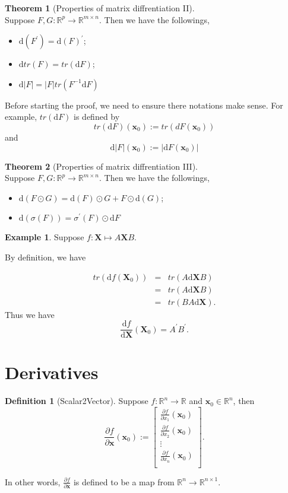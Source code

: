 \documentclass[12pt]{article}
\theoremstyle{definition}
\newtheorem{definition}{Definition}[section]
\newtheorem{example}{Example}[section]
\newtheorem{theorem}{Theorem}[section]
\newcommand{\x}{\mathbf{x}}
\newcommand{\R}{\mathbb{R}}
\newcommand{\X}{\mathbf{X}}
\newcommand{\D}{\mathrm{d}}
\begin{document}
\begin{theorem}[Properties of matrix diffrentiation II] \ \\
Suppose $F,G: \R^p \to \R^{ m\times n}$.
Then we have the followings,
\begin{itemize}
	\item $\D (F^\prime) = \D(F)^\prime$;
	\item $\D tr(F) = tr(\D F)$;
	\item $\D |F| = |F|tr(F^{-1}\D F)$
\end{itemize}
Before starting the proof, we need to ensure there notations make sense. For example,  $tr(\D F)$ is defined by 
$$
tr(\D F)(\x_0):=tr(dF(\x_0))
$$
and 
$$
\D |F|(\x_0) := |\D F(\x_0)|
$$
\end{theorem}



\begin{theorem}[Properties of matrix diffrentiation III] \ \\
Suppose $F,G: \R^p \to \R^{ m\times n}$.
Then we have the followings,
\begin{itemize}
	\item $\D (F \odot G) = \D(F) \odot G+ F \odot \D(G)$;
	\item $\D(\sigma(F)) = \sigma^\prime (F) \odot \D F$
\end{itemize}
\end{theorem}
\begin{example}
Suppose $f: \X \mapsto A\X B$.
\end{example}
By definition, we have

\begin{eqnarray*}
	tr(\D f(\X_0)) &=& tr(A\D{\X}B) \\
	&=& tr(A\D \X B) \\
	&=& tr(BA\D \X).
\end{eqnarray*}
Thus we have
$$
\frac{\D f}{\D \X }(\X_0) = A^\prime B^\prime.
$$
\section{Derivatives}
\begin{definition}[Scalar2Vector]
Suppose $f:\R^n \to \R$ and $\x_0 \in \R^n$, then 
$$
\frac{\partial f}{\partial \x}(\x_0):= \begin{bmatrix}
	\frac{\partial f}{\partial x_1}(\x_0) \\
	\frac{\partial f}{\partial x_2}(\x_0) \\
	\vdots \\
	\frac{\partial f}{\partial x_n}(\x_0) \\
\end{bmatrix}.
$$
\end{definition}
In other words, $\frac{\partial f}{\partial \x}$ is defined to be a map from $\R^n \to \R^{n \times 1}.$
\end{document}
